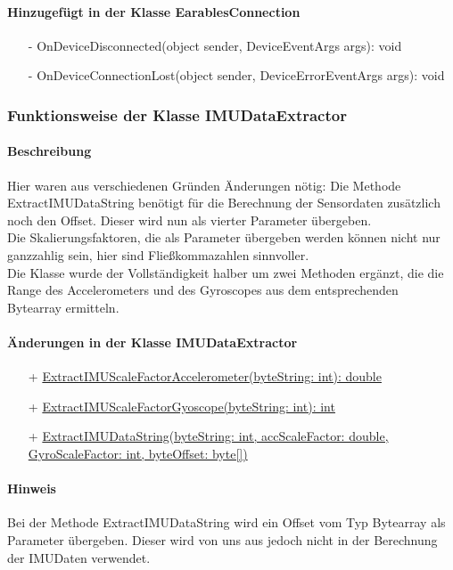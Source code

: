 \documentclass[a4paper,12pt]{article}
\begin{document}
\paragraph{Hinzugefügt in der Klasse EarablesConnection}

\begin{itemize}
	\item[-] OnDeviceDisconnected(object sender, DeviceEventArgs args): void 
	\item[-] OnDeviceConnectionLost(object sender, DeviceErrorEventArgs args): void
\end{itemize}

\subsubsection{Funktionsweise der Klasse IMUDataExtractor}
\paragraph{Beschreibung}
Hier waren aus verschiedenen Gründen Änderungen nötig: 
Die Methode ExtractIMUDataString benötigt für die Berechnung der Sensordaten zusätzlich noch den Offset. Dieser wird nun als vierter Parameter übergeben.\\
 Die Skalierungsfaktoren, die als Parameter übergeben werden können nicht nur ganzzahlig sein, hier sind Fließkommazahlen sinnvoller.\\
Die Klasse wurde der Vollständigkeit halber um zwei Methoden ergänzt, die die Range des Accelerometers und des Gyroscopes aus dem entsprechenden Bytearray ermitteln.
\paragraph{Änderungen in der Klasse IMUDataExtractor}
\begin{itemize}
	\item[+] \underline{ExtractIMUScaleFactorAccelerometer(byteString: int): double}
	\item[+] \underline{ExtractIMUScaleFactorGyoscope(byteString: int): int}
	 \item[+] \underline{ExtractIMUDataString(byteString: int, accScaleFactor: double,} \\
	 \underline{GyroScaleFactor: int, byteOffset: byte[])} 
\end{itemize}
\paragraph{Hinweis}
Bei der Methode ExtractIMUDataString wird ein Offset vom Typ Bytearray als Parameter übergeben. Dieser wird von uns aus jedoch nicht in der Berechnung der IMUDaten verwendet.
\end{document}
